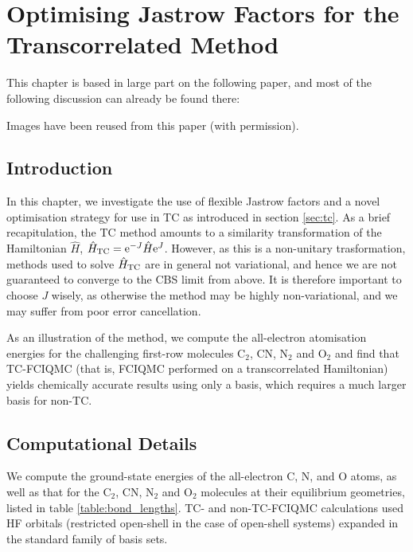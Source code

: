 \chapter{Optimising Jastrow Factors for the Transcorrelated Method}
  \label{chap:opt}

This chapter is based in large part on the following paper, and most of the following discussion can already be found there:\\

Images have been reused from this paper (with permission).

\section{Introduction}

In this chapter, we investigate the use of flexible Jastrow factors and a novel optimisation strategy for use in \gls{TC} as introduced in section \ref{sec:tc}. As a brief recapitulation, the TC method amounts to a similarity transformation of the Hamiltonian $\hat H$, $\hat H_\mathrm{TC} = \mathrm{e}^{-J}\hat H\mathrm{e}^J$. However, as this is a non-unitary trasformation, methods used to solve $\hat H_\mathrm{TC}$ are in general not variational, and hence we are not guaranteed to converge to the \gls{CBS} limit from above. It is therefore important to choose $J$ wisely, as otherwise the method may be highly non-variational, and we may suffer from poor error cancellation.

As an illustration of the method, we compute the all-electron atomisation energies for the challenging first-row molecules C$_2$, CN, N$_2$ and O$_2$ and find that \gls{TC}-\gls{FCIQMC} (that is, \gls{FCIQMC} performed on a transcorrelated Hamiltonian) yields chemically accurate results using only a \vtz basis, which requires a much larger  basis for non-TC.

\section{Computational Details}
We compute the ground-state energies of the all-electron C, N, and O atoms, as well as that for the C$_2$, CN, N$_2$ and O$_2$ molecules at their equilibrium geometries, listed in table
\ref{table:bond_lengths}.
TC- and non-TC-FCIQMC calculations used \gls{HF} orbitals (restricted open-shell in the case of open-shell systems) expanded in the standard  family of basis sets.


